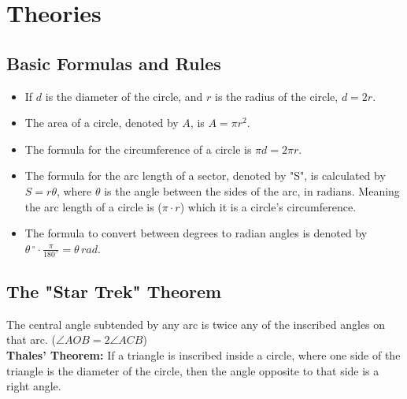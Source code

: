 \documentclass[12pt]{article}
\newcommand\ddfrac[2]{\frac{\displaystyle #1}{\displaystyle #2}}
\begin{document}
 

\pagebreak
\section{Theories}
	\subsection{Basic Formulas and Rules}
	\begin{itemize}
		\item If $d$ is the diameter of the circle, and $r$ is the radius of the circle, $d=2r$.
		\item The area of a circle, denoted by $A$, is $A=\pi r^2$.
		\item The formula for the circumference of a circle is $\pi d=2\pi r$.
		\item The formula for the arc length of a sector, denoted by "S", is calculated by $S=r\theta$, where $\theta$ is the angle between the sides of the arc, in radians. Meaning the arc length of a circle is ($\pi \cdot r$) which it is a circle's circumference.
		\item The formula to convert between degrees to radian angles is denoted by $\theta\,^{\circ}\cdot \ddfrac{\pi}{180^{\,\circ}}=\theta \, rad$.
	\end{itemize}

	\large
	\subsection{The "Star Trek" Theorem}
	The central angle subtended by any arc is twice any of the inscribed angles on that arc.
	 ($\angle AOB = 2\angle ACB$)\\
	
	\textbf{Thales' Theorem:} If a triangle is inscribed inside a circle, where one side of the triangle is the diameter of the circle, then the angle opposite to that side is a right angle.
	
\end{document}
